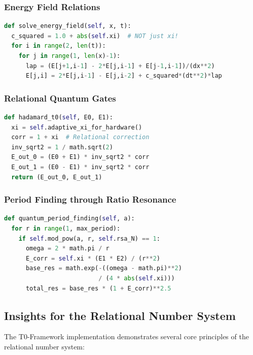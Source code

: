 	\subsubsection{Energy Field Relations}
	\begin{lstlisting}[language=Python,breaklines=true,frame=none,basicstyle=\scriptsize\ttfamily]
def solve_energy_field(self, x, t):
  c_squared = 1.0 + abs(self.xi)  # NOT just xi!
  for i in range(2, len(t)):
    for j in range(1, len(x)-1):
      lap = (E[j+1,i-1] - 2*E[j,i-1] + E[j-1,i-1])/(dx**2)
      E[j,i] = 2*E[j,i-1] - E[j,i-2] + c_squared*(dt**2)*lap
	\end{lstlisting}
	
	\subsubsection{Relational Quantum Gates}
	\begin{lstlisting}[language=Python,breaklines=true,frame=none,basicstyle=\scriptsize\ttfamily]
def hadamard_t0(self, E0, E1):
  xi = self.adaptive_xi_for_hardware()
  corr = 1 + xi  # Relational correction
  inv_sqrt2 = 1 / math.sqrt(2)
  E_out_0 = (E0 + E1) * inv_sqrt2 * corr
  E_out_1 = (E0 - E1) * inv_sqrt2 * corr
  return (E_out_0, E_out_1)
	\end{lstlisting}
	
	\subsubsection{Period Finding through Ratio Resonance}
	\begin{lstlisting}[language=Python,breaklines=true,frame=none,basicstyle=\scriptsize\ttfamily]
def quantum_period_finding(self, a):
  for r in range(1, max_period):
    if self.mod_pow(a, r, self.rsa_N) == 1:
      omega = 2 * math.pi / r
      E_corr = self.xi * (E1 * E2) / (r**2)
      base_res = math.exp(-((omega - math.pi)**2) 
                          / (4 * abs(self.xi)))
      total_res = base_res * (1 + E_corr)**2.5
	\end{lstlisting}
	
	\subsection{Insights for the Relational Number System}
	
	The T0-Framework implementation demonstrates several core principles of the relational number system:
	

